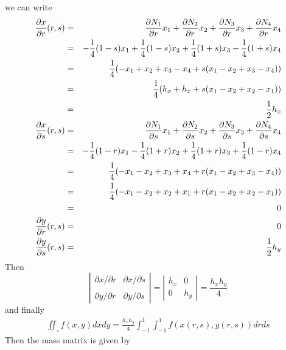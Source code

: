 we can write
\begin{eqnarray}
\frac{\partial x}{\partial r}(r,s)
&=&\frac{\partial N_1}{\partial r} x_1+\frac{\partial N_2}{\partial r} x_2
+\frac{\partial N_3}{\partial r} x_3+\frac{\partial N_4}{\partial r} x_4 \nonumber\\
&=& -\frac{1}{4}(1-s) x_1 + \frac{1}{4}(1-s) x_2 + \frac{1}{4}(1+s) x_3 - \frac{1}{4}(1+s) x_4 \nonumber\\
&=& \frac{1}{4} ( -x_1 +x_2 +x_3 -x_4  +s (x_1 -x_2 +x_3 -x_4)   )  \nonumber\\
&=& \frac{1}{4} ( h_x+h_x  +s (x_1 -x_2 +x_2 -x_1)   )  \nonumber\\
&=& \frac{1}{2} h_x \nonumber\\
\frac{\partial x}{\partial s}(r,s)
&=&\frac{\partial N_1}{\partial s} x_1+\frac{\partial N_2}{\partial s} x_2
+\frac{\partial N_3}{\partial s} x_3+\frac{\partial N_4}{\partial s} x_4 \nonumber\\
&=& -\frac{1}{4}(1-r)x_1 - \frac{1}{4}(1+r)x_2 +\frac{1}{4}(1+r)x_3 +\frac{1}{4}(1-r)x_4 \nonumber\\
&=& \frac{1}{4} ( -x_1 -x_2 +x_3+x_4 + r(x_1-x_2+x_3-x_4) ) \nonumber\\ 
&=& \frac{1}{4} ( -x_1 -x_2 +x_2+x_1 + r(x_1-x_2+x_2-x_1) ) \nonumber\\
&=& 0 \nonumber\\ 
\frac{\partial y}{\partial r}(r,s)
&=& 0 \nonumber\\
\frac{\partial y}{\partial s}(r,s)
&=& \frac{1}{2} h_y
\end{eqnarray}
Then 
\[
\left| 
\begin{array}{cc}
\partial x/\partial r & \partial x/\partial s \\ \\
\partial y/\partial r & \partial y/\partial s 
\end{array}
\right|  
=
\left| 
\begin{array}{cc}
h_x & 0 \\
0 & h_y 
\end{array}
\right|  
= \frac{h_xh_y}{4}
\]
and finally  
\begin{eqnarray}
\boxed{
\iint_\square f(x,y) dx dy =  \frac{h_xh_y}{4} \int_{-1}^{1} \int_{-1}^{1} f(x(r,s),y(r,s)) dr ds
}
\end{eqnarray}
Then the mass matrix is given by
